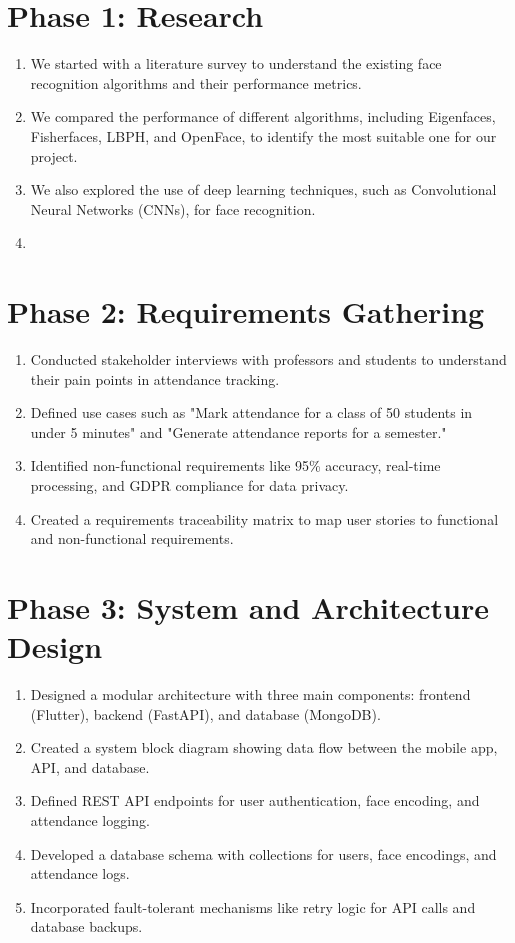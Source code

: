 \documentclass[openany]{report}
\begin{document}
\section{Phase 1: Research}

\begin{enumerate}
    \item We started with a literature survey to understand the existing face recognition algorithms and their performance metrics.
    \item We compared the performance of different algorithms, including Eigenfaces, Fisherfaces, LBPH, and OpenFace, to identify the most suitable one for our project.
    \item We also explored the use of deep learning techniques, such as Convolutional Neural Networks (CNNs), for face recognition.
    \item 
\end{enumerate}

\section{Phase 2: Requirements Gathering}

\begin{enumerate}
    \item Conducted stakeholder interviews with professors and students to understand their pain points in attendance tracking.
    \item Defined use cases such as "Mark attendance for a class of 50 students in under 5 minutes" and "Generate attendance reports for a semester."
    \item Identified non-functional requirements like 95\% accuracy, real-time processing, and GDPR compliance for data privacy.
    \item Created a requirements traceability matrix to map user stories to functional and non-functional requirements.
\end{enumerate}

\section{Phase 3: System and Architecture Design}

\begin{enumerate}
    \item Designed a modular architecture with three main components: frontend (Flutter), backend (FastAPI), and database (MongoDB).
    \item Created a system block diagram showing data flow between the mobile app, API, and database.
    \item Defined REST API endpoints for user authentication, face encoding, and attendance logging.
    \item Developed a database schema with collections for users, face encodings, and attendance logs.
    \item Incorporated fault-tolerant mechanisms like retry logic for API calls and database backups.
\end{enumerate}
\end{document}

